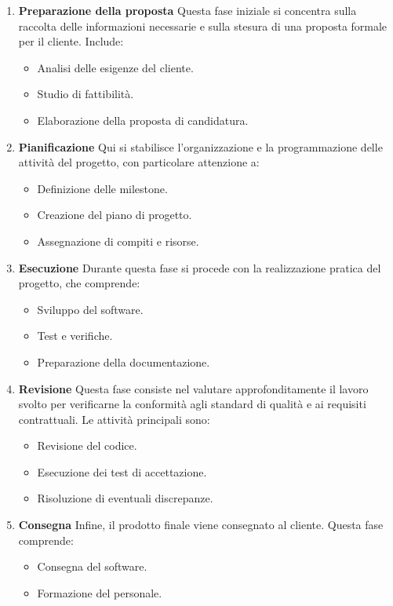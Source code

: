 \begin{enumerate}
    \item \textbf{Preparazione della proposta}  
    Questa fase iniziale si concentra sulla raccolta delle informazioni necessarie e sulla stesura di una proposta formale per il cliente. Include:  
    \begin{itemize}
        \item Analisi delle esigenze del cliente.  
        \item Studio di fattibilità.  
        \item Elaborazione della proposta di candidatura.  
    \end{itemize}
    
    \item \textbf{Pianificazione}  
    Qui si stabilisce l’organizzazione e la programmazione delle attività del progetto, con particolare attenzione a:  
    \begin{itemize}
        \item Definizione delle milestone.  
        \item Creazione del piano di progetto.  
        \item Assegnazione di compiti e risorse.  
    \end{itemize}
    
    \item \textbf{Esecuzione}  
    Durante questa fase si procede con la realizzazione pratica del progetto, che comprende:  
    \begin{itemize}
        \item Sviluppo del software.  
        \item Test e verifiche.  
        \item Preparazione della documentazione.  
    \end{itemize}
    
    \item \textbf{Revisione}  
    Questa fase consiste nel valutare approfonditamente il lavoro svolto per verificarne la conformità agli standard di qualità e ai requisiti contrattuali. Le attività principali sono:  
    \begin{itemize}
        \item Revisione del codice.  
        \item Esecuzione dei test di accettazione.  
        \item Risoluzione di eventuali discrepanze.  
    \end{itemize}
    
    \item \textbf{Consegna}  
    Infine, il prodotto finale viene consegnato al cliente. Questa fase comprende:  
    \begin{itemize}
        \item Consegna del software.  
        \item Formazione del personale.  
    \end{itemize}
\end{enumerate}

